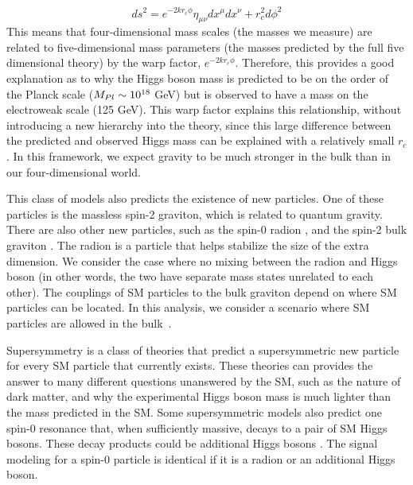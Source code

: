 \begin{equation}
ds^{2} = e^{-2kr_{c}\phi}\eta_{\mu\nu}dx^{\mu}dx^{\nu} + r^{2}_{c}d\phi^{2} 
\end{equation}
This means that four-dimensional mass scales (the masses we measure) are related to five-dimensional mass parameters (the masses predicted by the full five dimensional theory) by the warp factor, $e^{-2kr_{c}\phi}$. Therefore, this provides a good explanation as to why the Higgs boson mass is predicted to be on the order of the Planck scale ($M_{Pl} \sim 10^{18}$ GeV) but is observed to have a mass on the electroweak scale (125 GeV). This warp factor explains this relationship, without introducing a new hierarchy into the theory, since this large difference between the predicted and observed Higgs mass can be explained with a relatively small $r_{c}$. In this framework, we expect gravity to be much stronger in the bulk than in our four-dimensional world.

This class of models also predicts the existence of new particles. One of these particles is the massless spin-2 graviton, which is related to quantum gravity. There are also other new particles, such as the spin-0 radion \cite{Goldberger:1999uk,DeWolfe:1999cp,Csaki:1999mp}, and the spin-2 bulk graviton \cite{Davoudiasl:1999jd,Csaki:2000zn, Agashe:2007zd}. The radion is a particle that helps stabilize the size of the extra dimension. We consider the case where no mixing between the radion and Higgs boson (in other words, the two have separate mass states unrelated to each other). The couplings of SM particles to the bulk graviton depend on where SM particles can be located. In this analysis, we consider a scenario where SM particles are allowed in the bulk~\cite{Fitzpatrick:2007qr}.

Supersymmetry is a class of theories that predict a supersymmetric new particle for every SM particle that currently exists. These theories can provides the answer to many different questions unanswered by the SM, such as the nature of dark matter, and why the experimental Higgs boson mass is much lighter than the mass predicted in the SM.  Some supersymmetric models also predict one spin-0 resonance that, when sufficiently massive, decays to a pair of SM Higgs bosons. These decay products could be additional Higgs bosons \cite{Djouadi:2005gj,Barbieri:2013nka}. The signal modeling for a spin-0 particle is identical if it is a radion or an additional Higgs boson.

